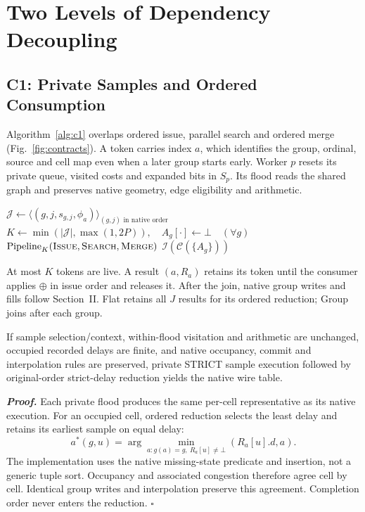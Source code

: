 \section{Two Levels of Dependency Decoupling}

\subsection{C1: Private Samples and Ordered Consumption}
Algorithm~\ref{alg:c1} overlaps ordered issue, parallel search and ordered merge (Fig.~\ref{fig:contracts}). A token carries index $a$, which identifies the group, ordinal, source and cell map even when a later group starts early. Worker $p$ resets its private queue, visited costs and expanded bits in $S_p$. Its flood reads the shared graph and preserves native geometry, edge eligibility and arithmetic.

\begin{algorithm}[t]
\caption{Bounded STRICT sample pipeline (C1)}\label{alg:c1}
$\mathcal J\gets\langle(g,j,s_{g,j},\phi_a)\rangle_{(g,j)\text{ in native order}}$\;
$K\gets\min(|\mathcal J|,\max(1,2P)),\quad A_g[\cdot]\gets\bot\quad(\forall g)$\;
$\operatorname{Pipeline}_K(\textsc{Issue},\textsc{Search},\textsc{Merge})$\;
\Return $\mathcal I(\mathcal C(\{A_g\}))$\;
\end{algorithm}

At most $K$ tokens are live. A result $(a,R_a)$ retains its token until the consumer applies $\oplus$ in issue order and releases it. After the join, native group writes and fills follow Section~II. Flat retains all $J$ results for its ordered reduction; Group joins after each group.

\begin{proposition}
If sample selection/context, within-flood visitation and arithmetic are unchanged, occupied recorded delays are finite, and native occupancy, commit and interpolation rules are preserved, private STRICT sample execution followed by original-order strict-delay reduction yields the native wire table.
\end{proposition}
\noindent\textbf{\emph{Proof.}} Each private flood produces the same per-cell representative as its native execution. For an occupied cell, ordered reduction selects the least delay and retains its earliest sample on equal delay:
\begin{equation}
 a^*(g,u)=\arg\min_{a:g(a)=g,\ R_a[u]\ne\bot}(R_a[u].d,a).
\end{equation}
The implementation uses the native missing-state predicate and insertion, not a generic tuple sort. Occupancy and associated congestion therefore agree cell by cell. Identical group writes and interpolation preserve this agreement. Completion order never enters the reduction. $\square$

